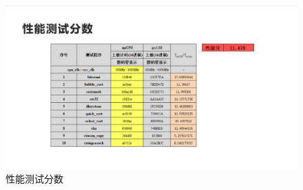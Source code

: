 \begin{figure}[H]
    \centering
    \includegraphics[width=\textwidth]{image/perf_score.png}
    \caption{性能测试分数}
\end{figure}
